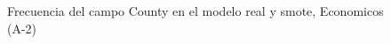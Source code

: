 \begin{figure}[H]
    \centering
    
    \caption{Frecuencia del campo County en el modelo real y smote, Economicos (A-2)}
    \label{frecuency-County-smote-enc}
\end{figure}